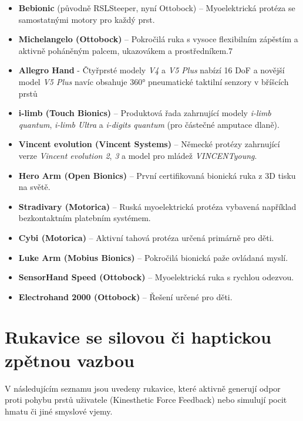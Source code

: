 \begin{itemize}
    \item \textbf{Bebionic} (původně RSLSteeper, nyní Ottobock) – Myoelektrická protéza se samostatnými motory pro každý prst.
    \item \textbf{Michelangelo (Ottobock)} – Pokročilá ruka s vysoce flexibilním zápěstím a aktivně poháněným palcem, ukazovákem a prostředníkem.7
    \item \textbf{Allegro Hand} - Čtyřprsté modely \textit{V4} a \textit{V5 Plus} nabízí 16 DoF a novější model \textit{V5 Plus} navíc obsahuje 360° pneumatické taktilní senzory v bříšcích prstů
    \item \textbf{i-limb (Touch Bionics)} – Produktová řada zahrnující modely \textit{i-limb quantum}, \textit{i-limb Ultra} a \textit{i-digits quantum} (pro částečné amputace dlaně).
    \item \textbf{Vincent evolution (Vincent Systems)} – Německé protézy zahrnující verze \textit{Vincent evolution 2}, \textit{3} a model pro mládež \textit{VINCENTyoung}.
    \item \textbf{Hero Arm (Open Bionics)} – První certifikovaná bionická ruka z 3D tisku na světě.
    \item \textbf{Stradivary (Motorica)} – Ruská myoelektrická protéza vybavená například bezkontaktním platebním systémem.
    \item \textbf{Cybi (Motorica)} – Aktivní tahová protéza určená primárně pro děti.
    \item \textbf{Luke Arm (Mobius Bionics)} – Pokročilá bionická paže ovládaná myslí.
    \item \textbf{SensorHand Speed (Ottobock)} – Myoelektrická ruka s rychlou odezvou.
    \item \textbf{Electrohand 2000 (Ottobock)} – Řešení určené pro děti.
\end{itemize}




\cite{Najman2017}
\cite{Koprnicky2017cz}
\cite{Koprnicky2017eng}
\cite{Koprnicky2018}
\cite{Koprnicky2019}

\cite{ENABLEFuture}
\cite{ExiiiHACKberry}
\cite{LimbitlessSolutions}

\section{Rukavice se silovou či haptickou zpětnou vazbou}
V následujícím seznamu jsou uvedeny rukavice, které aktivně generují odpor proti pohybu prstů uživatele (Kinesthetic Force Feedback) nebo simulují pocit hmatu  či  jiné smyslové vjemy.



